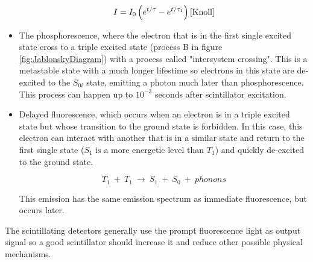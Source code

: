 \begin{itemize}
\begin{equation}
I=I_0\left(e^{t/\tau} - e^{t/\tau_1}\right) \cite{Knoll}
\label{eq:IntensityTimeScintillator}
\end{equation}

\item{} The phosphorescence, where the electron that is in the first single excited state cross to a triple excited state (process B in figure \ref{fig:JablonskyDiagram}) with a process called "intersystem crossing". This is a metastable state with a much longer lifestime so electrons in this state are de-excited to the $S_{0i}$ state, emitting a photon much later than phosphorescence. This process can happen up to $10^{-3}$ seconds after scintillator excitation.

\item{} Delayed fluorescence, which occurs when an electron is in a triple excited state but whose transition to the ground state is forbidden. In this case, this electron can interact with another that is in a similar state and return to the first single state ($S_{1}$ is a more energetic level than $T_{1}$) and quickly de-excited to the ground state. 

\begin{equation}
T_{1} ~+~ T_{1}~ \longrightarrow ~ S_{1} ~+~ S_{0} ~+~ phonons
\label{eq:DelayFluorescence}
\end{equation}

This emission has the same emission spectrum as immediate fluorescence, but occurs later.

\end{itemize}

The scintillating detectors generally use the prompt fluorescence light as output signal so a good scintillator should increase it and reduce other possible physical mechanisms.